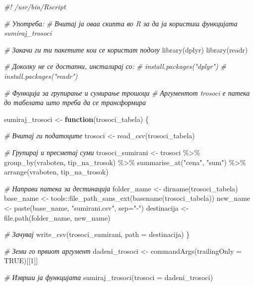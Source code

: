 \documentclass[
]{book}
\newenvironment{Shaded}{\begin{snugshade}}{\end{snugshade}}
\newcommand{\AttributeTok}[1]{\textcolor[rgb]{0.77,0.63,0.00}{#1}}
\newcommand{\CommentTok}[1]{\textcolor[rgb]{0.56,0.35,0.01}{\textit{#1}}}
\newcommand{\ConstantTok}[1]{\textcolor[rgb]{0.00,0.00,0.00}{#1}}
\newcommand{\ControlFlowTok}[1]{\textcolor[rgb]{0.13,0.29,0.53}{\textbf{#1}}}
\newcommand{\DecValTok}[1]{\textcolor[rgb]{0.00,0.00,0.81}{#1}}
\newcommand{\FunctionTok}[1]{\textcolor[rgb]{0.00,0.00,0.00}{#1}}
\newcommand{\NormalTok}[1]{#1}
\newcommand{\OtherTok}[1]{\textcolor[rgb]{0.56,0.35,0.01}{#1}}
\newcommand{\SpecialCharTok}[1]{\textcolor[rgb]{0.00,0.00,0.00}{#1}}
\newcommand{\StringTok}[1]{\textcolor[rgb]{0.31,0.60,0.02}{#1}}
\begin{document}
\begin{Shaded}
\begin{Highlighting}[]
\CommentTok{\#! /usr/bin/Rscript}

\CommentTok{\# Употреба:}
\CommentTok{\# Вчитај ја оваа скипта во R за да ја користиш функцијата \textasciigrave{}sumiraj\_trosoci\textasciigrave{}  }

\CommentTok{\# Закачи ги ти пакетите кои се користат подолу }
\FunctionTok{library}\NormalTok{(dplyr)}
\FunctionTok{library}\NormalTok{(readr)}

\CommentTok{\# Доколку не се достапни, инсталирај со:}
\CommentTok{\# install.packages("dplyr")}
\CommentTok{\# install.packages("readr")}

\CommentTok{\# Функција за групирање и сумирање трошоци}
\CommentTok{\# Аргументот \textasciigrave{}trosoci\textasciigrave{} е патека до табелата што треба да се трансформира}

\NormalTok{sumiraj\_trosoci }\OtherTok{\textless{}{-}} \ControlFlowTok{function}\NormalTok{(trosoci\_tabela) \{}
  
  \CommentTok{\# Вчитај ги податоците}
\NormalTok{  trosoci }\OtherTok{\textless{}{-}} \FunctionTok{read\_csv}\NormalTok{(trosoci\_tabela)}
  
  \CommentTok{\# Групирај и пресметај суми}
\NormalTok{  trosoci\_sumirani }\OtherTok{\textless{}{-}}\NormalTok{ trosoci }\SpecialCharTok{\%\textgreater{}\%}
    \FunctionTok{group\_by}\NormalTok{(vraboten, tip\_na\_trosok) }\SpecialCharTok{\%\textgreater{}\%}
    \FunctionTok{summarise\_at}\NormalTok{(}\StringTok{"cena"}\NormalTok{, }\StringTok{"sum"}\NormalTok{) }\SpecialCharTok{\%\textgreater{}\%} 
  \FunctionTok{arrange}\NormalTok{(vraboten, tip\_na\_trosok)}
  
  \CommentTok{\# Направи патека за дестинација}
\NormalTok{  folder\_name }\OtherTok{\textless{}{-}} \FunctionTok{dirname}\NormalTok{(trosoci\_tabela)}
\NormalTok{  base\_name }\OtherTok{\textless{}{-}}\NormalTok{ tools}\SpecialCharTok{::}\FunctionTok{file\_path\_sans\_ext}\NormalTok{(}\FunctionTok{basename}\NormalTok{(trosoci\_tabela))}
\NormalTok{  new\_name }\OtherTok{\textless{}{-}} \FunctionTok{paste}\NormalTok{(base\_name, }\StringTok{"sumirani.csv"}\NormalTok{, }\AttributeTok{sep=}\StringTok{"{-}"}\NormalTok{)}
\NormalTok{  destinacija }\OtherTok{\textless{}{-}} \FunctionTok{file.path}\NormalTok{(folder\_name, new\_name)}
  
  \CommentTok{\# Зачувај}
  \FunctionTok{write\_csv}\NormalTok{(trosoci\_sumirani, }\AttributeTok{path =}\NormalTok{ destinacija)}
\NormalTok{\}}

\CommentTok{\# Земи го првиот аргумент}
\NormalTok{dadeni\_trosoci }\OtherTok{\textless{}{-}} \FunctionTok{commandArgs}\NormalTok{(}\AttributeTok{trailingOnly =} \ConstantTok{TRUE}\NormalTok{)[[}\DecValTok{1}\NormalTok{]]}

\CommentTok{\# Изврши ја функцијата}
\FunctionTok{sumiraj\_trosoci}\NormalTok{(}\AttributeTok{trosoci =}\NormalTok{ dadeni\_trosoci)}
\end{Highlighting}
\end{Shaded}
\end{document}
